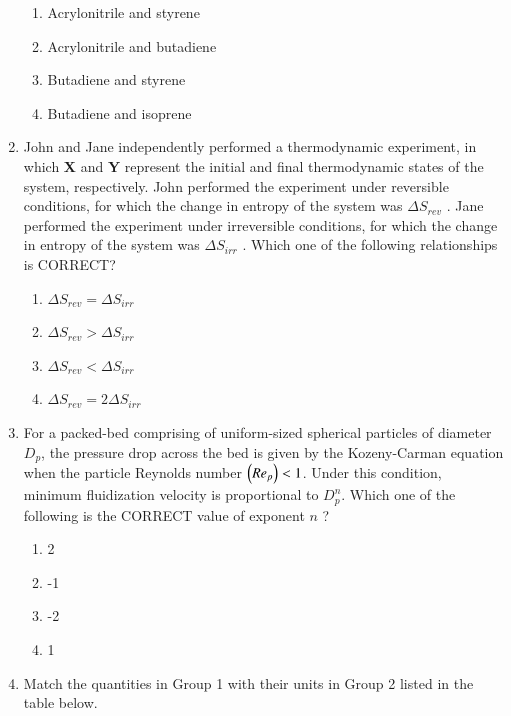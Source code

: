\documentclass[journal,12pt,onecolumn]{IEEEtran}
\theoremstyle{remark}
\begin{document}
\begin{enumerate}
\hfill{}
\begin{enumerate}
    \item Acrylonitrile and styrene
    \item Acrylonitrile and butadiene
    \item Butadiene and styrene
    \item Butadiene and isoprene
\end{enumerate}

    \item John and Jane independently performed a thermodynamic experiment, in which \textbf{X} and \textbf{Y} represent the initial and final thermodynamic states of the system, respectively. John performed the experiment under reversible conditions, for which the change in entropy of the system was $\Delta S_{rev}$ . Jane performed the experiment under irreversible conditions, for which the change in entropy of the system was $\Delta S_{irr}$ . Which one of the following relationships is CORRECT?
    
\hfill{}
\begin{enumerate}
    \item $\Delta S_{rev} = \Delta S_{irr}$
    \item $\Delta S_{rev} > \Delta S_{irr}$
    \item $\Delta S_{rev} < \Delta S_{irr}$
    \item $\Delta S_{rev} = 2\Delta S_{irr}$
\end{enumerate}

     \item For a packed-bed comprising of uniform-sized spherical particles of diameter $D_p$, the pressure drop across the bed is given by the Kozeny-Carman equation when the particle Reynolds number $\left(Re_p\right) < 1$. Under this condition, minimum fluidization velocity is proportional to $D^n_p$. Which one of the following is the CORRECT value of exponent $n$ ?
     
\hfill{}
\begin{enumerate}
    \item 2
    \item -1
    \item -2
    \item 1
\end{enumerate}

    \item Match the quantities in Group 1 with their units in Group 2 listed in the table below.
    

\end{enumerate}
\end{document}
